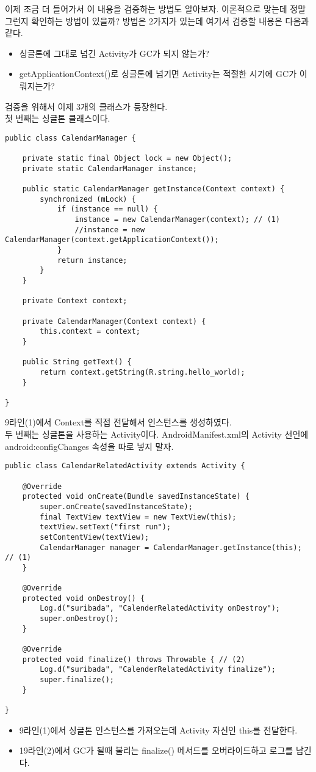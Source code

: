 
이제 조금 더 들어가서 이 내용을 검증하는 방법도 알아보자.
이론적으로 맞는데 정말 그런지 확인하는 방법이 있을까? 
방법은 2가지가 있는데 여기서 검증할 내용은 다음과 같다. 
\begin{itemize}
\item 싱글톤에 그대로 넘긴 Activity가 GC가 되지 않는가?
\item getApplicationContext()로 싱글톤에 넘기면 Activity는 적절한 시기에 GC가 이뤄지는가?
\end{itemize}

검증을 위해서 이제 3개의 클래스가 등장한다.\\ 

첫 번째는 싱글톤 클래스이다.
\begin{lstlisting}[frame=single]
public class CalendarManager {

	private static final Object lock = new Object();
	private static CalendarManager instance;
	
	public static CalendarManager getInstance(Context context) {
		synchronized (mLock) {
			if (instance == null) {
				instance = new CalendarManager(context); // (1)
				//instance = new CalendarManager(context.getApplicationContext());
			}
			return instance;
		}
	}
	
	private Context context;
	
	private CalendarManager(Context context) {
		this.context = context;
	}
	
	public String getText() {
		return context.getString(R.string.hello_world);
	}

}
\end{lstlisting}
9라인(1)에서 Context를 직접 전달해서 인스턴스를 생성하였다.\\

두 번째는 싱글톤을 사용하는 Activity이다. AndroidManifest.xml의 Activity 선언에 android:config\-Changes 속성을 따로 넣지 말자.
\begin{lstlisting}[frame=single]
public class CalendarRelatedActivity extends Activity {

	@Override
	protected void onCreate(Bundle savedInstanceState) {
		super.onCreate(savedInstanceState);
		final TextView textView = new TextView(this);
		textView.setText("first run");
		setContentView(textView);
		CalendarManager manager = CalendarManager.getInstance(this); // (1)
	}

	@Override
	protected void onDestroy() {
		Log.d("suribada", "CalenderRelatedActivity onDestroy");
		super.onDestroy();
	}
	
	@Override
	protected void finalize() throws Throwable { // (2)
		Log.d("suribada", "CalenderRelatedActivity finalize");
		super.finalize();
	}
	
}
\end{lstlisting}
\begin{itemize}
\item 9라인(1)에서 싱글톤 인스턴스를 가져오는데 Activity 자신인 this를 전달한다.
\item 19라인(2)에서 GC가 될때 불리는 finalize() 메서드를 오버라이드하고 로그를 남긴다.
\end{itemize}

